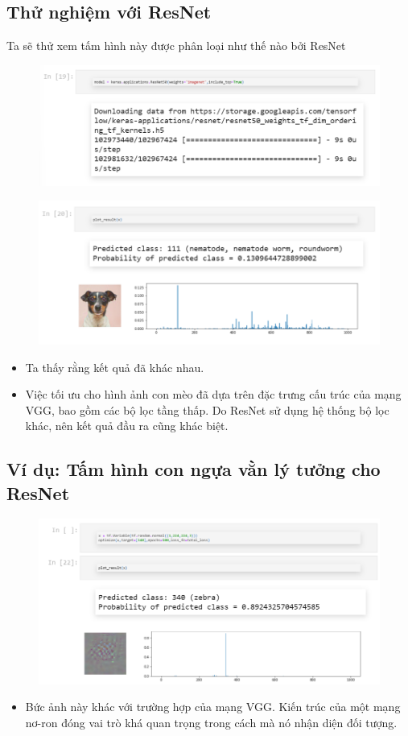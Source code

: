 \documentclass{book}
\begin{document}
\subsection{Thử nghiệm với ResNet}
Ta sẽ thử xem tấm hình này được phân loại như thế nào bởi ResNet
\begin{figure}[H]
	\centering
	\includegraphics[width=0.75\linewidth]{images/ad12_restnet.png}
\end{figure}
\begin{figure}[H]
	\centering
	\includegraphics[width=0.75\linewidth]{images/ad13_predict.png}
\end{figure}
\begin{itemize}
	\item Ta thấy rằng kết quả đã khác nhau.
	\item Việc tối ưu cho hình ảnh con mèo đã dựa trên đặc trưng cấu trúc của mạng VGG, bao gồm các bộ lọc tầng thấp. Do ResNet sử dụng hệ thống bộ lọc khác, nên kết quả đầu ra cũng khác biệt.
\end{itemize}
\subsection{Ví dụ: Tấm hình con ngựa vằn lý tưởng cho ResNet}
\begin{figure}[H]
	\centering
	\includegraphics[width=0.75\linewidth]{images/ad14_predict.png}
\end{figure}
\begin{itemize}
	\item Bức ảnh này khác với trường hợp của mạng VGG. Kiến trúc của một mạng nơ-ron đóng vai trò khá quan trọng trong cách mà nó nhận diện đối tượng.
\end{itemize}
\end{document}
